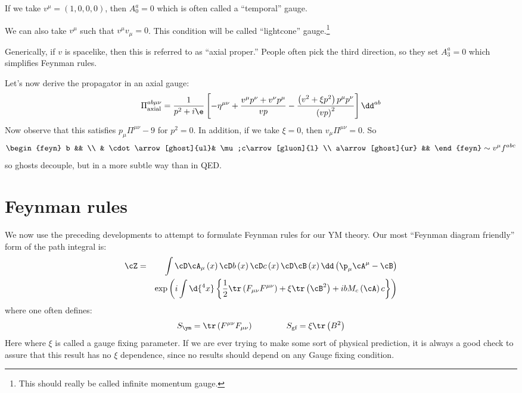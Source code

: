 \documentclass{booc}
\begin{document}
\begin{exm}
If we take $v^\mu = \left( 1, 0,0,0 \right)$, then 
$A_0^a = 0$ which is often called a ``temporal'' gauge.

We can also take $v^\mu$ such that $v^\mu v_\mu = 0$. 
This condition will be called ``lightcone'' gauge.\footnote{
This should really be called infinite momentum gauge.}

Generically, if $v$ is spacelike, then this is referred to as ``axial proper.''
People often pick the third direction, so they set $A_3^a = 0$ which simplifies 
Feynman rules. 
\end{exm}

Let's now derive the propagator in an axial gauge:
\begin{equation}
\Pi^{ab\mu\nu}_{\text{axial}} = 
\frac{1}{p^2 + i\e}
\left[ -\eta^{\mu\nu}+ 
\frac{v^\mu p^\nu + v^\nu p^\mu}{vp} - 
\frac{\left( v^2 + \xi p^2 \right)p^\mu p^\nu}{\left( vp \right)^2}\right]\dd^{ab}
\end{equation}
Now observe that this satisfies
$p_\mu \Pi^{\mu\nu} - 9$ for $p^2 = 0$. 
In addition, if we take $\xi = 0$, then $v_\mu \Pi^{\mu\nu} = 0$. 
So
\begin{equation}
\begin{feyn}
b && \\
& \cdot\arrow[ghost]{ul}&
\mu;c\arrow[gluon]{l} \\
a\arrow[ghost]{ur} &&
\end{feyn}\sim
v^\mu f^{abc}
\end{equation}
so ghosts decouple, but in a more subtle way than in QED.

\section{Feynman rules}

We now use the preceding developments to attempt to formulate Feynman rules
for our YM theory.
Our most ``Feynman diagram friendly'' form of the path integral is:
\begin{eqnarray}
\cZ &=&  \int \cD \cA_\mu\left( x \right) \cD b\left( x \right) \cD c\left( x \right) \cD \cB\left( x \right)
\dd\left( \p_\mu \cA^\mu - \cB \right)
\\ && \exp\left( 
i\int \d{^4 x}\left\{ \frac{1}{2} \tr\left( F_{\mu\nu}F^{\mu\nu} \right) + 
\xi \tr\left( \cB^2 \right) + i b M_c\left( \cA \right)c\right\}\right)
\end{eqnarray}
where one often defines:
\begin{equation}
S_\ym = \tr\left( F^{\mu\nu}F_{\mu\nu} \right)
\qquad\qquad
S_{\text{gf}} = \xi \tr\left( B^2 \right)
\end{equation}
Here where $\xi$ is called a gauge fixing parameter. 
If we are ever trying to make some sort of physical prediction, it is always a good check
to assure that this result has no $\xi$ dependence, since no results should depend on any
Gauge fixing condition.
\end{document}
